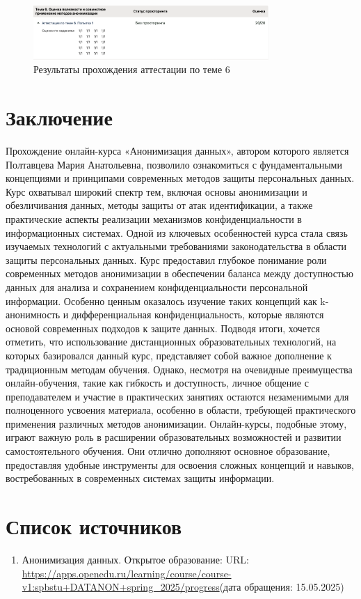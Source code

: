 \documentclass[areasetadvanced]{scrartcl}
\begin{document}
\begin{figure}[H]
    \centering
    \includegraphics[width=0.8\textwidth]{images/6.png}
    \caption{Результаты прохождения аттестации по теме 6}
    \label{fig:7}
\end{figure}
\newpage
\section{Заключение}
Прохождение онлайн-курса «Анонимизация данных», автором которого является Полтавцева Мария Анатольевна, позволило ознакомиться с фундаментальными концепциями и принципами современных методов защиты персональных данных. Курс охватывал широкий спектр тем, включая основы анонимизации и обезличивания данных, методы защиты от атак идентификации, а также практические аспекты реализации механизмов конфиденциальности в информационных системах. Одной из ключевых особенностей курса стала связь изучаемых технологий с актуальными требованиями законодательства в области защиты персональных данных.
Курс предоставил глубокое понимание роли современных методов анонимизации в обеспечении баланса между доступностью данных для анализа и сохранением конфиденциальности персональной информации. Особенно ценным оказалось изучение таких концепций как k-анонимность и дифференциальная конфиденциальность, которые являются основой современных подходов к защите данных.
Подводя итоги, хочется отметить, что использование дистанционных образовательных технологий, на которых базировался данный курс, представляет собой важное дополнение к традиционным методам обучения. Однако, несмотря на очевидные преимущества онлайн-обучения, такие как гибкость и доступность, личное общение с преподавателем и участие в практических занятиях остаются незаменимыми для полноценного усвоения материала, особенно в области, требующей практического применения различных методов анонимизации.
Онлайн-курсы, подобные этому, играют важную роль в расширении образовательных возможностей и развитии самостоятельного обучения. Они отлично дополняют основное образование, предоставляя удобные инструменты для освоения сложных концепций и навыков, востребованных в современных системах защиты информации.
\newpage
\section{Список источников}
\begin{enumerate}
    \item Анонимизация данных. Открытое образование: URL: \url{https://apps.openedu.ru/learning/course/course-v1:spbstu+DATANON+spring_2025/progress}(дата обращения: 15.05.2025)
\end{enumerate}
\end{document}
